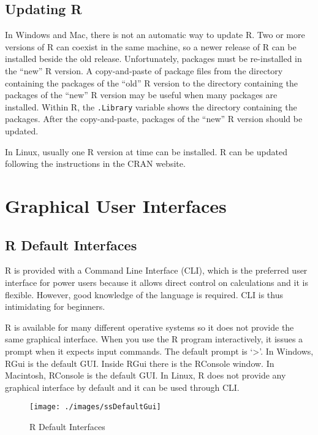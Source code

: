 \documentclass[]{book}
\begin{document}
\subsection{Updating R}\label{updating-r}

In Windows and Mac, there is not an automatic way to update R. Two or
more versions of R can coexist in the same machine, so a newer release
of R can be installed beside the old release. Unfortunately, packages
must be re-installed in the ``new'' R version. A copy-and-paste of
package files from the directory containing the packages of the ``old''
R version to the directory containing the packages of the ``new'' R
version may be useful when many packages are installed. Within R, the
\texttt{.Library} variable shows the directory containing the packages.
After the copy-and-paste, packages of the ``new'' R version should be
updated.

In Linux, usually one R version at time can be installed. R can be
updated following the instructions in the CRAN website.

\section{Graphical User Interfaces}\label{graphical-user-interfaces}

\subsection{R Default Interfaces}\label{r-default-interfaces}

R is provided with a Command Line Interface (CLI), which is the
preferred user interface for power users because it allows direct
control on calculations and it is flexible. However, good knowledge of
the language is required. CLI is thus intimidating for beginners.

R is available for many different operative systems so it does not
provide the same graphical interface. When you use the R program
interactively, it issues a prompt when it expects input commands. The
default prompt is `\textgreater{}'. In Windows, RGui is the default GUI.
Inside RGui there is the RConsole window. In Macintosh, RConsole is the
default GUI. In Linux, R does not provide any graphical interface by
default and it can be used through CLI.

\begin{figure}

{\centering \texttt{[image: ./images/ssDefaultGui]} 

}

\caption{R Default Interfaces}\label{fig:g3}
\end{figure}
\end{document}
